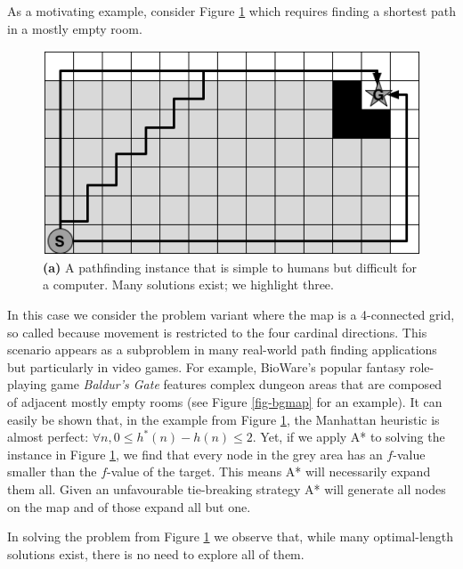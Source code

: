 As a motivating example, consider Figure \ref{fig-emptymap} which requires 
finding a shortest path in a mostly empty room.
\begin{figure}[htbp]
       \begin{center}
                       \includegraphics[scale=0.50, trim = 10mm 10mm 10mm 0mm]{diagrams/emptymap.png}
       \end{center}
	\vspace{-3pt}
       \caption{\textbf{(a)} A pathfinding instance that is simple to humans but difficult for a computer. 
				Many solutions exist; we highlight three. }
       \label{fig-emptymap}
\end{figure}
In this case we consider the problem variant where the map is a 4-connected grid, 
so called because movement is restricted to the four cardinal directions.
This scenario appears as a subproblem in many real-world path finding applications but particularly
in video games.
For example, BioWare's popular fantasy role-playing game \emph{Baldur's Gate} features complex dungeon
 areas that are composed of adjacent mostly empty rooms (see Figure \ref{fig-bgmap} for an example).
It can easily be shown that, in the example from Figure \ref{fig-emptymap}, the Manhattan heuristic is almost perfect: $\forall n, 0 \leq h^*(n) - h(n) \leq 2$.
Yet, if we apply A* to solving the instance in Figure \ref{fig-emptymap}, 
we find that every node in the grey area has an $f$-value smaller than the $f$-value of the target.
This means A* will necessarily expand them all. 
Given an unfavourable tie-breaking strategy A* will generate all nodes on the map and of those expand 
all but one.
\par
In solving the problem from Figure \ref{fig-emptymap} we observe that,
while many optimal-length solutions exist, there is no need to explore all of them.
